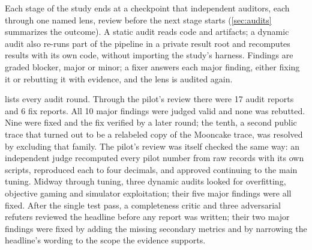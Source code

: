 Each stage of the study ends at a checkpoint that independent auditors, each through one named lens,
review before the next stage starts (\cref{sec:audits} summarizes the outcome). A static audit reads
code and artifacts; a dynamic audit also re-runs part of the pipeline in a private result root and
recomputes results with its own code, without importing the study's harness. Findings are graded
blocker, major or minor; a fixer answers each major finding, either fixing it or rebutting it with
evidence, and the lens is audited again.

 lists every audit round. Through the pilot's review there were 17 audit reports
and 6 fix reports. All 10 major findings were judged
valid and none was rebutted. Nine were fixed and the fix verified by a later round; the tenth, a
second public trace that turned out to be a relabeled copy of the Mooncake trace, was resolved by
excluding that family. The pilot's review was itself checked the same way: an independent judge
recomputed every pilot number from raw records with its own scripts, reproduced each to four
decimals, and approved continuing to the main tuning. Midway through tuning, three dynamic audits
looked for overfitting, objective gaming and simulator exploitation; their five major findings were
all fixed. After the single test pass, a completeness critic and three adversarial refuters reviewed
the headline before any report was written; their two major findings were fixed by adding the
missing secondary metrics and by narrowing the headline's wording to the scope the evidence
supports.
